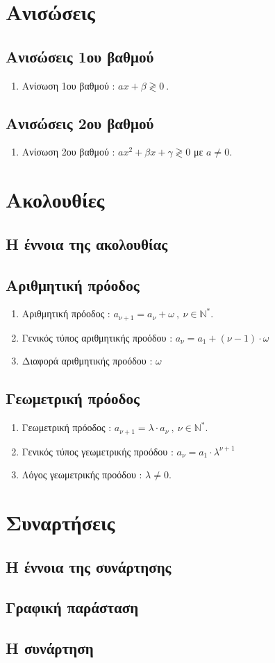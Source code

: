 \documentclass[a4paper,11pt]{article}
\begin{document}
\section{Ανισώσεις}
\subsection{Ανισώσεις 1ου βαθμού}
\begin{enumerate}
\item Ανίσωση 1ου βαθμού : $ax+\beta\gtrless0\ $.
\end{enumerate}
\subsection{Ανισώσεις 2ου βαθμού}
\begin{enumerate}
\item Ανίσωση 2ου βαθμού : $ax^2+\beta x+\gamma\gtrless0$ με $a\neq 0$.
\end{enumerate}
\section{Ακολουθίες}
\subsection{Η έννοια της ακολουθίας}
\subsection{Αριθμητική πρόοδος}
\begin{enumerate}
\item Αριθμητική πρόοδος : $a_{\nu+1}=a_{\nu}+\omega\ ,\ \nu\in\mathbb{N}^*$.
\item Γενικός τύπος αριθμητικής προόδου : $a_{\nu}=a_1+(\nu-1)\cdot\omega$
\item Διαφορά αριθμητικής προόδου : $\omega$
\end{enumerate}
\subsection{Γεωμετρική πρόοδος}
\begin{enumerate}[resume]
\item Γεωμετρική πρόοδος : $a_{\nu+1}=\lambda\cdot a_{\nu}\ ,\ \nu\in\mathbb{N}^*$.
\item Γενικός τύπος γεωμετρικής προόδου : $a_{\nu}=a_1\cdot\lambda^{\nu+1}$
\item Λόγος γεωμετρικής προόδου : $\lambda\neq 0$.
\end{enumerate}
\section{Συναρτήσεις}
\subsection{Η έννοια της συνάρτησης}
\subsection{Γραφική παράσταση}
\subsection{Η συνάρτηση }
\end{document}
